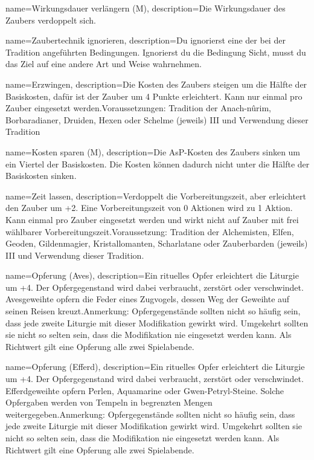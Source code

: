 {
    name={Wirkungsdauer verlängern (M)},
    description={Die Wirkungsdauer des Zaubers verdoppelt sich.}
}


{
    name={Zaubertechnik ignorieren},
    description={Du ignorierst eine der bei der Tradition angeführten Bedingungen. Ignorierst du die Bedingung Sicht, musst du das Ziel auf eine andere Art und Weise wahrnehmen.}
}


{
    name={Erzwingen},
    description={Die Kosten des Zaubers steigen um die Hälfte der Basiskosten, dafür ist der Zauber um 4 Punkte erleichtert. Kann nur einmal pro Zauber eingesetzt werden.\newline Voraussetzungen: Tradition der Anach-nûrim, Borbaradianer, Druiden, Hexen oder Schelme (jeweils) III und Verwendung dieser Tradition}
}


{
    name={Kosten sparen (M)},
    description={Die AsP-Kosten des Zaubers sinken um ein Viertel der Basiskosten. Die Kosten können dadurch nicht unter die Hälfte der Basiskosten sinken.}
}


{
    name={Zeit lassen},
    description={Verdoppelt die Vorbereitungszeit, aber erleichtert den Zauber um +2. Eine Vorbereitungszeit von 0 Aktionen wird zu 1 Aktion. Kann einmal pro Zauber eingesetzt werden und wirkt nicht auf Zauber mit frei wählbarer Vorbereitungszeit.\newline Voraussetzung: Tradition der Alchemisten, Elfen, Geoden, Gildenmagier, Kristallomanten, Scharlatane oder Zauberbarden (jeweils) III und Verwendung dieser Tradition.}
}


{
    name={Opferung (Aves)},
    description={Ein rituelles Opfer erleichtert die Liturgie um +4. Der Opfergegenstand wird dabei verbraucht, zerstört oder verschwindet. Avesgeweihte opfern die Feder eines Zugvogels, dessen Weg der Geweihte auf seinen Reisen kreuzt.\newline Anmerkung: Opfergegenstände sollten nicht so häufig sein, dass jede zweite Liturgie mit dieser Modifikation gewirkt wird. Umgekehrt sollten sie nicht so selten sein, dass die Modifikation nie eingesetzt werden kann. Als Richtwert gilt eine Opferung alle zwei Spielabende.}
}


{
    name={Opferung (Efferd)},
    description={Ein rituelles Opfer erleichtert die Liturgie um +4. Der Opfergegenstand wird dabei verbraucht, zerstört oder verschwindet. Efferdgeweihte opfern Perlen, Aquamarine oder Gwen-Petryl-Steine. Solche Opfergaben werden von Tempeln in begrenzten Mengen weitergegeben.\newline Anmerkung: Opfergegenstände sollten nicht so häufig sein, dass jede zweite Liturgie mit dieser Modifikation gewirkt wird. Umgekehrt sollten sie nicht so selten sein, dass die Modifikation nie eingesetzt werden kann. Als Richtwert gilt eine Opferung alle zwei Spielabende.}
}


